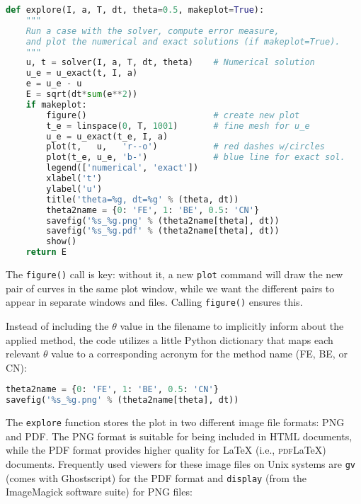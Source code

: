 \documentclass[graybox,sectrefs,envcountresetchap,open=right,final]{svmonodo}
\begin{document}
\begin{lstlisting}[language=Python,style=blue1_bluegreen]
def explore(I, a, T, dt, theta=0.5, makeplot=True):
    """
    Run a case with the solver, compute error measure,
    and plot the numerical and exact solutions (if makeplot=True).
    """
    u, t = solver(I, a, T, dt, theta)    # Numerical solution
    u_e = u_exact(t, I, a)
    e = u_e - u
    E = sqrt(dt*sum(e**2))
    if makeplot:
        figure()                         # create new plot
        t_e = linspace(0, T, 1001)       # fine mesh for u_e
        u_e = u_exact(t_e, I, a)
        plot(t,   u,   'r--o')           # red dashes w/circles
        plot(t_e, u_e, 'b-')             # blue line for exact sol.
        legend(['numerical', 'exact'])
        xlabel('t')
        ylabel('u')
        title('theta=%g, dt=%g' % (theta, dt))
        theta2name = {0: 'FE', 1: 'BE', 0.5: 'CN'}
        savefig('%s_%g.png' % (theta2name[theta], dt))
        savefig('%s_%g.pdf' % (theta2name[theta], dt))
        show()
    return E
\end{lstlisting}

The \texttt{figure()} call is key: without it, a new \texttt{plot} command will
draw the new pair of curves in the same plot window, while we want
the different pairs to appear in separate windows and files.
Calling \texttt{figure()} ensures this.

Instead of including the $\theta$ value in the filename to implicitly
inform about the applied method, the code utilizes a little Python
dictionary that maps each relevant $\theta$ value to a corresponding
acronym for the method name (FE, BE, or CN):

\begin{lstlisting}[language=Python,style=blue1_bluegreen]
theta2name = {0: 'FE', 1: 'BE', 0.5: 'CN'}
savefig('%s_%g.png' % (theta2name[theta], dt))
\end{lstlisting}

  

The \texttt{explore} function stores the plot in two different image file formats:
PNG and PDF. The PNG format is suitable for
being included in HTML documents, while the PDF format provides
higher quality for {\LaTeX} (i.e., \textsc{pdf}{\LaTeX}) documents.
Frequently used viewers for these
image files on Unix systems are \texttt{gv} (comes with Ghostscript)
for the PDF format and
\texttt{display} (from the ImageMagick software suite) for PNG files:
\end{document}
